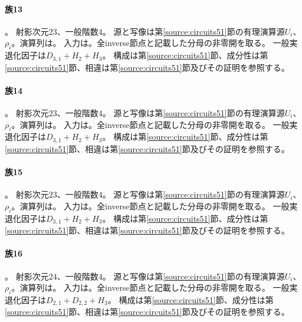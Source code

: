 \paragraph{族13}\label{catalogue:T13}
。
射影次元$23$、一般階数$4$。
源と写像は第\ref{source:circuits51}節の有理演算源$U_i$、$\rho_i$。演算列は。
入力は。全inverse節点と記載した分母の非零開を取る。
一般実退化因子は$D_{3,1}+H_{2}+H_{3}$。
構成は第\ref{source:circuits51}節、成分性は第\ref{source:circuits51}節、相違は第\ref{source:circuits51}節及びその証明を参照する。

\paragraph{族14}\label{catalogue:T14}
。
射影次元$23$、一般階数$4$。
源と写像は第\ref{source:circuits51}節の有理演算源$U_i$、$\rho_i$。演算列は。
入力は。全inverse節点と記載した分母の非零開を取る。
一般実退化因子は$D_{3,1}+H_{2}+H_{3}$。
構成は第\ref{source:circuits51}節、成分性は第\ref{source:circuits51}節、相違は第\ref{source:circuits51}節及びその証明を参照する。

\paragraph{族15}\label{catalogue:T15}
。
射影次元$23$、一般階数$4$。
源と写像は第\ref{source:circuits51}節の有理演算源$U_i$、$\rho_i$。演算列は。
入力は。全inverse節点と記載した分母の非零開を取る。
一般実退化因子は$D_{3,1}+H_{2}+H_{3}$。
構成は第\ref{source:circuits51}節、成分性は第\ref{source:circuits51}節、相違は第\ref{source:circuits51}節及びその証明を参照する。

\paragraph{族16}\label{catalogue:T16}
。
射影次元$24$、一般階数$4$。
源と写像は第\ref{source:circuits51}節の有理演算源$U_i$、$\rho_i$。演算列は。
入力は。全inverse節点と記載した分母の非零開を取る。
一般実退化因子は$D_{2,1}+D_{2,2}+H_{3}$。
構成は第\ref{source:circuits51}節、成分性は第\ref{source:circuits51}節、相違は第\ref{source:circuits51}節及びその証明を参照する。

